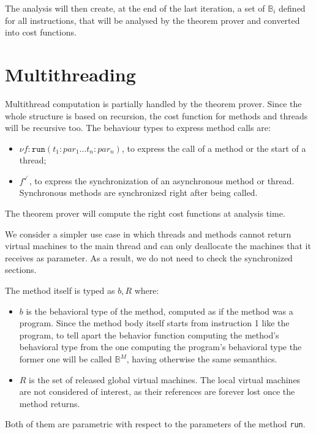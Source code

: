 \documentclass{amsart}
\newcommand{\bB}[1]{\mathbb{B}_{#1}}
\newcommand{\wrt}{with respect to}
\numberwithin{equation}{section}
\theoremstyle{plain} %
\theoremstyle{definition}
\theoremstyle{remark}
\begin{document}
The analysis will then create, at the end of the last iteration, a set of $\bB{i}$ defined for all instructions, that will be analysed by the theorem prover and converted into cost functions.
\pagebreak
\section{Multithreading}
Multithread computation is partially handled by the theorem prover. Since the whole structure is based on recursion, the cost function for methods and threads will be recursive too. The behaviour types to express method calls are:
\begin{itemize}
\item $\nu f:\texttt{run}(t_1:par_1 \dots t_n:par_n)$, to express the call of a method or the start of a thread;
\item $f^\checkmark$, to express the synchronization of an asynchronous method or thread. Synchronous methods are synchronized right after being called.
\end{itemize}
The theorem prover will compute the right cost functions at analysis time.

We consider a simpler use case in which threads and methods cannot return virtual machines to the main thread and can only deallocate the machines that it receives as parameter. As a result, we do not need to check the synchronized sections.

The method itself is typed as $b, R$ where:
\begin{itemize}
\item $b$ is the behavioral type of the method, computed as if the method was a program. Since the method body itself starts from instruction 1 like the program, to tell apart the behavior function computing the method's behavioral type from the one computing the program's behavioral type the former one will be called $\bB{}^M$, having otherwise the same semanthics.
\item $R$ is the set of released global virtual machines. The local virtual machines are not considered of interest, as their references are forever lost once the method returns.
\end{itemize}
Both of them are parametric \wrt{} the parameters of the method \texttt{run}.
\end{document}
